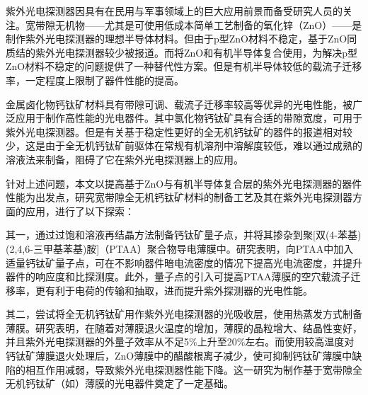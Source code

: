 ﻿%


\begin{cnabstract}

紫外光电探测器因具有在民用与军事领域上的巨大应用前景而备受研究人员的关注。宽带隙无机物——尤其是可使用低成本简单工艺制备的氧化锌（ZnO）——是制作紫外光电探测器的理想半导体材料。但由于p型ZnO材料不稳定，基于ZnO同质结的紫外光电探测器较少被报道。而将ZnO和有机半导体复合使用，为解决p型ZnO材料不稳定的问题提供了一种替代性方案。但是有机半导体较低的载流子迁移率，一定程度上限制了器件性能的提高。

金属卤化物钙钛矿材料具有带隙可调、载流子迁移率较高等优异的光电性能，被广泛应用于制作高性能的光电器件。其中氯化物钙钛矿具有合适的带隙宽度，可用于紫外光电探测器。但是有关基于稳定性更好的全无机钙钛矿的器件的报道相对较少，这是由于全无机钙钛矿前驱体在常规有机溶剂中溶解度较低，难以通过成熟的溶液法来制备，阻碍了它在紫外光电探测器上的应用。

针对上述问题，本文以提高基于ZnO与有机半导体复合层的紫外光电探测器的器件性能为出发点，研究宽带隙全无机钙钛矿材料的制备工艺及其在紫外光电探测器方面的应用，进行了以下探索：

其一，通过过饱和溶液再结晶方法制备钙钛矿量子点，并将其掺杂到聚[双(4-苯基)(2,4,6-三甲基苯基)胺]（PTAA）聚合物导电薄膜中。研究表明，向PTAA中加入适量钙钛矿量子点，可在不影响器件暗电流密度的情况下提高光电流密度，并提升器件的响应度和比探测度。此外，量子点的引入可提高PTAA薄膜的空穴载流子迁移率，更有利于电荷的传输和抽取，进而提升紫外探测器的光电性能。

其二，尝试将全无机钙钛矿用作紫外光电探测器的光吸收层，使用热蒸发方式制备薄膜。研究表明，在随着对薄膜退火温度的增加，薄膜的晶粒增大、结晶性变好，并且紫外光电探测器的外量子效率从不足5\%上升至20\%左右。而使用较高温度对钙钛矿薄膜退火处理后，ZnO薄膜中的醋酸根离子减少，使可抑制钙钛矿薄膜中缺陷的相互作用减弱，导致紫外光电探测器性能下降。这一研究为制作基于宽带隙全无机钙钛矿（如）薄膜的光电器件奠定了一定基础。

\end{cnabstract}
\vspace{1em}\par\vfill


